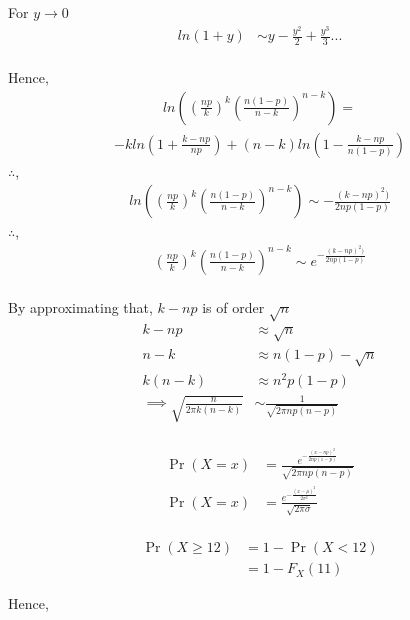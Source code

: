 \documentclass[journal,12pt,twocolumn]{IEEEtran}
\providecommand{\pr}[1]{\ensuremath{\Pr\left(#1\right)}}
\theoremstyle{remark}
\begin{document}
For \( y\to 0\)
\begin{align}
	ln(1+y) &\sim y - \frac{y^2}{2} +  \frac{y^3}{3} ...
\end{align}
\\
Hence,
\begin{align}
	ln\left(\left(\frac{np}{k}\right)^{k}\left(\frac{n(1-p)}{n-k}\right)^{n-k}\right) = 
\end{align}
\begin{align}
	-k ln\left(1 + \frac{k-np}{np}\right) + (n-k)ln\left(1 - \frac{k-np}{n(1-p)}\right)
\end{align}
$\therefore$,
\begin{align}
	ln\left(\left(\frac{np}{k}\right)^{k}\left(\frac{n(1-p)}{n-k}\right)^{n-k}\right) \sim - \frac{(k-np)^2)}{2np(1-p)}
\end{align}
$\therefore$,
\begin{align}
	\left(\frac{np}{k}\right)^{k}\left(\frac{n(1-p)}{n-k}\right)^{n-k} \sim e^{-\frac{(k-np)^2)}{2np(1-p)}}
\end{align}
\\
By approximating that, $k-np$ is of order $\sqrt{n}$
\begin{align}
	k-np &\approx \sqrt{n}\\
	n -k &\approx n(1-p) - \sqrt{n}\\
	k(n -k) &\approx n^2p(1-p)\\
	\implies
	\sqrt{\frac{n}{2\pi k (n-k)}} &\sim \frac{1}{\sqrt{2\pi np (n-p)}}
\end{align}
\\
\begin{align}
	\pr{X = x} &= \frac{e^{-\frac{(x-np)^2}{2np(1-p)}}}{\sqrt{2\pi np (n-p)}} \\
	\pr{X = x} &= \frac{e^{-\frac{(x-\mu)^2}{2\sigma^2}}}{\sqrt{2\pi\sigma}}
\end{align}
\\
\begin{align}
	\pr{X \geq 12} &= 1 - \pr{X < 12}\\
	&= 1 - F_X(11)
\end{align}

Hence,
\end{document}
